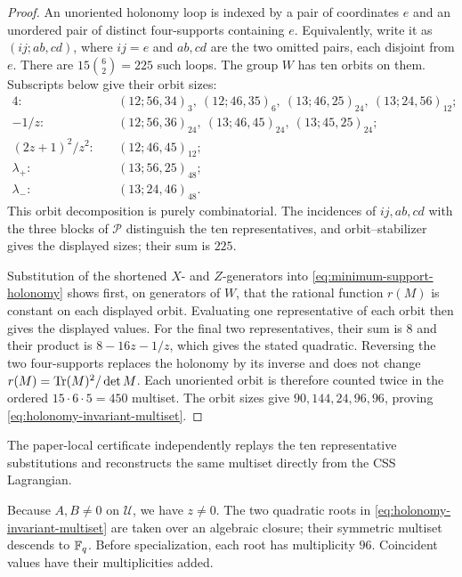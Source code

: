 \begin{proof}
An unoriented holonomy loop is indexed by a pair of coordinates \(e\) and an
unordered pair of distinct four-supports containing \(e\).  Equivalently,
write it as \((ij;ab,cd)\), where \(ij=e\) and \(ab,cd\) are the two omitted
pairs, each disjoint from \(e\).  There are
\(15\binom62=225\) such loops.  The group \(W\) has ten orbits on them.
Subscripts below give their orbit sizes:
\[
\begin{aligned}
4:\quad&
 (12;56,34)_{3},\ (12;46,35)_{6},\
 (13;46,25)_{24},\ (13;24,56)_{12};\\
-1/z:\quad&
 (12;56,36)_{24},\ (13;46,45)_{24},\ (13;45,25)_{24};\\
(2z+1)^2/z^2:\quad& (12;46,45)_{12};\\
\lambda_+:\quad& (13;56,25)_{48};\\
\lambda_-:\quad& (13;24,46)_{48}.
\end{aligned}
\]
This orbit decomposition is purely combinatorial.  The incidences of
\(ij,ab,cd\) with the three blocks of \(\mathcal P\) distinguish the ten
representatives, and orbit--stabilizer gives the displayed sizes; their sum
is \(225\).

Substitution of the shortened \(X\)- and \(Z\)-generators into
\eqref{eq:minimum-support-holonomy} shows first, on generators of \(W\), that
the rational function \(r(M)\) is constant on each displayed orbit.
Evaluating one representative of each orbit then gives the displayed values.
For the final two representatives, their sum is
\(8\) and their product is \(8-16z-1/z\), which gives the stated quadratic.
Reversing the two four-supports replaces the holonomy by its inverse and
does not change \(r(M)=\operatorname{Tr}(M)^2/\det M\).  Each unoriented orbit is therefore
counted twice in the ordered \(15\cdot6\cdot5=450\) multiset.  The orbit sizes
give \(90,144,24,96,96\), proving \eqref{eq:holonomy-invariant-multiset}.
\end{proof}

The paper-local certificate independently replays the ten representative
substitutions and reconstructs the same multiset directly from the CSS
Lagrangian.

Because \(A,B\ne0\) on \(\mathcal U\), we have \(z\ne0\).  The two quadratic
roots in \eqref{eq:holonomy-invariant-multiset} are taken over an algebraic
closure; their symmetric multiset descends to \(\mathbb F_q\).  Before
specialization, each root has multiplicity \(96\).  Coincident values have
their multiplicities added.

